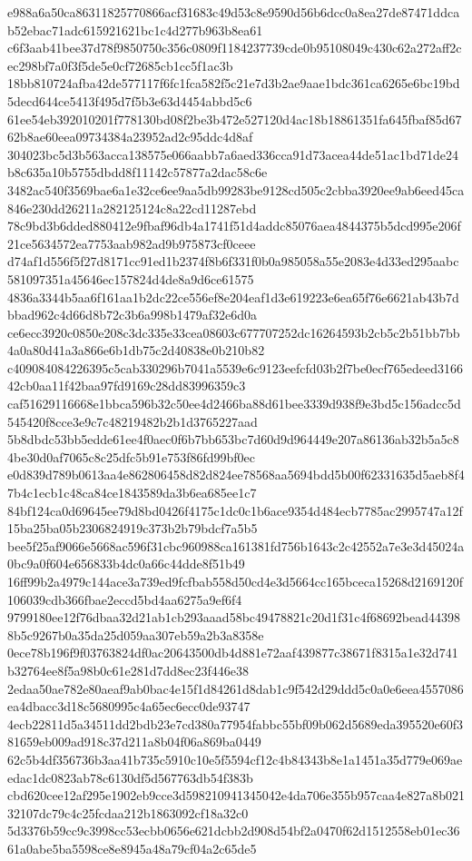 \documentclass[11pt,a4paper]{article}
\begin{document}
{e988a6a50ca86311825770866acf31683c49d53c8e9590d56b6dcc0a8ea27de87471ddcab52ebac71adc615921621bc1c4d277b963b8ea61
c6f3aab41bee37d78f9850750c356c0809f1184237739cde0b95108049c430c62a272aff2cec298bf7a0f3f5de5e0cf72685cb1cc5f1ac3b
18bb810724afba42de577117f6fc1fca582f5c21e7d3b2ae9aae1bdc361ca6265e6bc19bd5decd644ce5413f495d7f5b3e63d4454abbd5c6
61ee54eb392010201f778130bd08f2be3b472e527120d4ac18b18861351fa645fbaf85d6762b8ae60eea09734384a23952ad2c95ddc4d8af
304023bc5d3b563acca138575e066aabb7a6aed336cca91d73acea44de51ac1bd71de24b8c635a10b5755dbdd8f11142c57877a2dac58c6e
3482ac540f3569bae6a1e32ce6ee9aa5db99283be9128cd505c2cbba3920ee9ab6eed45ca846e230dd26211a282125124c8a22cd11287ebd
78c9bd3b6dded880412e9fbaf96db4a1741f51d4addc85076aea4844375b5dcd995e206f21ce5634572ea7753aab982ad9b975873cf0ceee
d74af1d556f5f27d8171cc91ed1b2374f8b6f331f0b0a985058a55e2083e4d33ed295aabc581097351a45646ec157824d4de8a9d6ce61575
4836a3344b5aa6f161aa1b2dc22ce556ef8e204eaf1d3e619223e6ea65f76e6621ab43b7dbbad962c4d66d8b72c3b6a998b1479af32e6d0a
ce6ecc3920c0850e208c3dc335e33cea08603c677707252dc16264593b2cb5c2b51bb7bb4a0a80d41a3a866e6b1db75c2d40838e0b210b82
c409084084226395c5cab330296b7041a5539e6c9123eefcfd03b2f7be0ecf765edeed316642cb0aa11f42baa97fd9169c28dd83996359c3
caf51629116668e1bbca596b32c50ee4d2466ba88d61bee3339d938f9e3bd5c156adcc5d545420f8cce3e9c7c48219482b2b1d3765227aad
5b8dbdc53bb5edde61ee4f0aec0f6b7bb653bc7d60d9d964449e207a86136ab32b5a5c84be30d0af7065c8c25dfc5b91e753f86fd99bf0ec
e0d839d789b0613aa4e862806458d82d824ee78568aa5694bdd5b00f62331635d5aeb8f47b4c1ecb1c48ca84ce1843589da3b6ea685ee1c7
84bf124ca0d69645ee79d8bd0426f4175c1dc0c1b6ace9354d484ecb7785ac2995747a12f15ba25ba05b2306824919c373b2b79bdcf7a5b5
bee5f25af9066e5668ac596f31cbc960988ca161381fd756b1643c2c42552a7e3e3d45024a0bc9a0f604e656833b4dc0a66c44dde8f51b49
16ff99b2a4979c144ace3a739ed9fcfbab558d50cd4e3d5664cc165bceca15268d2169120f106039cdb366fbae2eccd5bd4aa6275a9ef6f4
9799180ee12f76dbaa32d21ab1cb293aaad58bc49478821c20d1f31c4f68692bead443988b5c9267b0a35da25d059aa307eb59a2b3a8358e
0ece78b196f9f03763824df0ac20643500db4d881e72aaf439877c38671f8315a1e32d741b32764ee8f5a98b0c61e281d7dd8ec23f446e38
2edaa50ae782e80aeaf9ab0bac4e15f1d84261d8dab1c9f542d29ddd5c0a0e6eea4557086ea4dbacc3d18c5680995c4a65ec6ecc0de93747
4ecb22811d5a34511dd2bdb23e7cd380a77954fabbc55bf09b062d5689eda395520e60f381659eb009ad918c37d211a8b04f06a869ba0449
62c5b4df356736b3aa41b735c5910c10e5f5594cf12c4b84343b8e1a1451a35d779e069aeedac1dc0823ab78c6130df5d567763db54f383b
cbd620cee12af295e1902eb9cce3d598210941345042e4da706e355b957caa4e827a8b02132107dc79c4c25fcdaa212b1863092cf18a32c0
5d3376b59cc9c3998cc53ecbb0656e621dcbb2d908d54bf2a0470f62d1512558eb01ec3661a0abe5ba5598ce8e8945a48a79cf04a2c65de5
}
\end{document}
